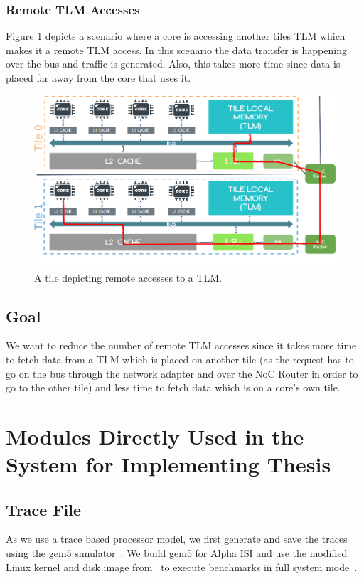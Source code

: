 \documentclass{listhesis}
\begin{document}
\subsubsection{Remote TLM Accesses}
Figure \ref{fig:remoteaccesses} depicts a scenario where a core is accessing another tiles TLM which makes it a remote TLM access. In this scenario the data transfer is happening over the bus and traffic is generated. Also, this takes more time since data is placed far away from the core that uses it. 
\begin{figure}
  \includegraphics[width=\linewidth]{remoteaccesses.png}
  \centering
  \caption{A tile depicting remote accesses to a TLM.}
  \label{fig:remoteaccesses}
\end{figure}
\subsection{Goal}
We want to reduce the number of remote TLM accesses since it takes more time to fetch data from a TLM which is placed on another tile (as the request has to go on the bus through the network adapter and over the NoC Router in order to go to the other tile) and less time to fetch data which is on a core's own tile.  
\section{Modules Directly Used in the System for Implementing Thesis}
\subsection{Trace File}
As we use a trace based processor model, we first generate and save the traces using the gem5 simulator~\cite{gem5}. We build gem5 for Alpha ISI and use the modified Linux kernel and disk image from~\cite{trace} to execute benchmarks in full system mode~\cite{lispaper}.
\end{document}
